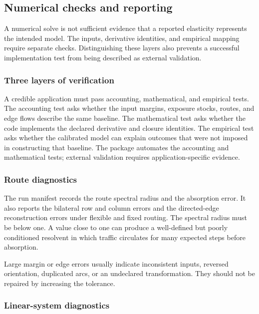 \subsection{Numerical checks and reporting}
\label{ch:diagnostics}

A numerical solve is not sufficient evidence that a reported elasticity
represents the intended model. The inputs, derivative identities, and
empirical mapping require separate checks. Distinguishing these layers also
prevents a successful implementation test from being described as external
validation.

\subsubsection{Three layers of verification}

A credible application must pass accounting, mathematical, and empirical
tests. The accounting test asks whether the input margins, exposure stocks,
routes, and edge flows describe the same baseline. The mathematical test asks
whether the code implements the declared derivative and closure identities.
The empirical test asks whether the calibrated model can explain outcomes that
were not imposed in constructing that baseline. The package automates the
accounting and mathematical tests; external validation requires
application-specific evidence.

\subsubsection{Route diagnostics}

The run manifest records the route spectral radius and the absorption error. It
also reports the bilateral row and column errors and the directed-edge
reconstruction errors under flexible and fixed routing.
The spectral radius must be below one. A value close to one can produce a
well-defined but poorly conditioned resolvent in which traffic circulates for
many expected steps before absorption.

Large margin or edge errors usually indicate inconsistent inputs, reversed
orientation, duplicated arcs, or an undeclared transformation. They should not
be repaired by increasing the tolerance.

\subsubsection{Linear-system diagnostics}

